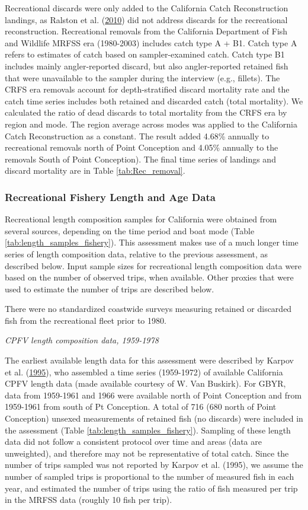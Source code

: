 \documentclass[12pt,]{article}
\begin{document}
Recreational discards were only added to the California Catch
Reconstruction landings, as Ralston et al.
(\protect\hyperlink{ref-Ralston2010}{2010}) did not address discards for
the recreational reconstruction. Recreational removals from the
California Department of Fish and Wildlife MRFSS era (1980-2003)
includes catch type A + B1. Catch type A refers to estimates of catch
based on sampler-examined catch. Catch type B1 includes mainly
angler-reported discard, but also angler-reported retained fish that
were unavailable to the sampler during the interview (e.g., fillets).
The CRFS era removals account for depth-stratified discard mortality
rate and the catch time series includes both retained and discarded
catch (total mortality). We calculated the ratio of dead discards to
total mortality from the CRFS era by region and mode. The region average
across modes was applied to the California Catch Reconstruction as a
constant. The result added 4.68\% annually to recreational removals
north of Point Conception and 4.05\% annually to the removals South of
Point Conception). The final time series of landings and discard
mortality are in Table \ref{tab:Rec_removal}.

\subsubsection{Recreational Fishery Length and Age
Data}\label{recreational-fishery-length-and-age-data}

Recreational length composition samples for California were obtained
from several sources, depending on the time period and boat mode (Table
\ref{tab:length_samples_fishery}). This assessment makes use of a much
longer time series of length composition data, relative to the previous
assessment, as described below. Input sample sizes for recreational
length composition data were based on the number of observed trips, when
available. Other proxies that were used to estimate the number of trips
are described below.

There were no standardized coastwide surveys measuring retained or
discarded fish from the recreational fleet prior to 1980.

\emph{CPFV length composition data, 1959-1978}

The earliest available length data for this assessment were described by
Karpov et al. (\protect\hyperlink{ref-Karpov1995}{1995}), who assembled
a time series (1959-1972) of available California CPFV length data (made
available courtesy of W. Van Buskirk). For GBYR, data from 1959-1961 and
1966 were available north of Point Conception and from 1959-1961 from
south of Pt Conception. A total of 716 (680 north of Point Conception)
unsexed measurements of retained fish (no discards) were included in the
assessment (Table \ref{tab:length_samples_fishery}). Sampling of these
length data did not follow a consistent protocol over time and areas
(data are unweighted), and therefore may not be representative of total
catch. Since the number of trips sampled was not reported by Karpov et
al. (1995), we assume the number of sampled trips is proportional to the
number of measured fish in each year, and estimated the number of trips
using the ratio of fish measured per trip in the MRFSS data (roughly 10
fish per trip).
\end{document}
